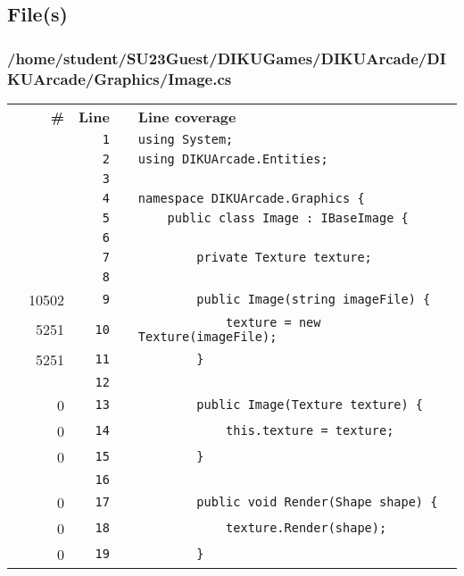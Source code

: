 \documentclass[a4paper,landscape,10pt]{article}
\begin{document}
\subsection{File(s)}
\subsubsection{/home/student/SU23Guest/DIKUGames/DIKUArcade/DIKUArcade/Graphics/Image.cs}
\begin{longtable}[l]{lrrll}
\textbf{} & \textbf{\#} & \textbf{Line} & \textbf{} & \textbf{Line coverage}\\
\cellcolor{gray} &  & \verb~1~ & & \verb~using System;~\\
\cellcolor{gray} &  & \verb~2~ & & \verb~using DIKUArcade.Entities;~\\
\cellcolor{gray} &  & \verb~3~ & & \verb~~\\
\cellcolor{gray} &  & \verb~4~ & & \verb~namespace DIKUArcade.Graphics {~\\
\cellcolor{gray} &  & \verb~5~ & & \verb~    public class Image : IBaseImage {~\\
\cellcolor{gray} &  & \verb~6~ & & \verb~~\\
\cellcolor{gray} &  & \verb~7~ & & \verb~        private Texture texture;~\\
\cellcolor{gray} &  & \verb~8~ & & \verb~~\\
\cellcolor{green} & 10502 & \verb~9~ & & \verb~        public Image(string imageFile) {~\\
\cellcolor{green} & 5251 & \verb~10~ & & \verb~            texture = new Texture(imageFile);~\\
\cellcolor{green} & 5251 & \verb~11~ & & \verb~        }~\\
\cellcolor{gray} &  & \verb~12~ & & \verb~~\\
\cellcolor{red} & 0 & \verb~13~ & & \verb~        public Image(Texture texture) {~\\
\cellcolor{red} & 0 & \verb~14~ & & \verb~            this.texture = texture;~\\
\cellcolor{red} & 0 & \verb~15~ & & \verb~        }~\\
\cellcolor{gray} &  & \verb~16~ & & \verb~~\\
\cellcolor{red} & 0 & \verb~17~ & & \verb~        public void Render(Shape shape) {~\\
\cellcolor{red} & 0 & \verb~18~ & & \verb~            texture.Render(shape);~\\
\cellcolor{red} & 0 & \verb~19~ & & \verb~        }~\\

\end{longtable}
\end{document}
